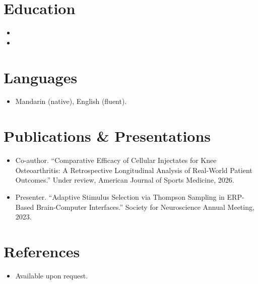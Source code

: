 \documentclass[11pt,a4paper,sans]{moderncv}
\begin{document}
\section{Education}
\vspace{1pt}
\begin{itemize}

\item{}

\vspace{3pt}

\item{}

\end{itemize}

\section{Languages}
\vspace{1pt}
\begin{itemize}
\item Mandarin (native), English (fluent).
\end{itemize}

\section{Publications \& Presentations}
\vspace{1pt}
\begin{itemize}
\item Co-author. ``Comparative Efficacy of Cellular Injectates for Knee Osteoarthritis: A Retrospective Longitudinal Analysis of Real-World Patient Outcomes.'' Under review, American Journal of Sports Medicine, 2026.
\item Presenter. ``Adaptive Stimulus Selection via Thompson Sampling in ERP-Based Brain-Computer Interfaces.'' Society for Neuroscience Annual Meeting, 2023.
\end{itemize}

\section{References}
\vspace{1pt}
\begin{itemize}
\item{Available upon request.}
\end{itemize}
\end{document}
